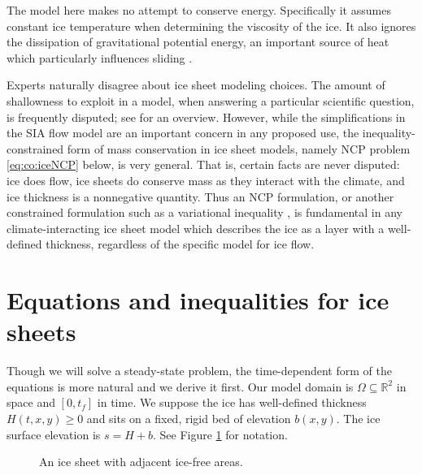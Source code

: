 \documentclass[final,leqno,onefignum,onetabnum]{siamltex1213bueler}
\newcommand\RR{\mathbb{R}}
\begin{document}
The model here makes no attempt to conserve energy.  Specifically it assumes constant ice temperature when determining the viscosity of the ice.  It also ignores the dissipation of gravitational potential energy, an important source of heat which particularly influences sliding \cite{Fowler1997,GreveBlatter2009,vanderVeen2013}.

Experts naturally disagree about ice sheet modeling choices.  The amount of shallowness to exploit in a model, when answering a particular scientific question, is frequently disputed; see \cite{SchoofHewitt2013} for an overview.  However, while the simplifications in the SIA flow model are an important concern in any proposed use, the inequality-constrained form of mass conservation in ice sheet models, namely NCP problem \eqref{eq:co:iceNCP} below, is very general.  That is, certain facts are never disputed: ice does flow, ice sheets do conserve mass as they interact with the climate, and ice thickness is a nonnegative quantity.  Thus an NCP formulation, or another constrained formulation such as a variational inequality \cite{JouvetBueler2012}, is fundamental in any climate-interacting ice sheet model which describes the ice as a layer with a well-defined thickness, regardless of the specific model for ice flow.


\section{Equations and inequalities for ice sheets}

Though we will solve a steady-state problem, the time-dependent form of the equations is more natural and we derive it first.  Our model domain is $\Omega \subseteq \RR^2$ in space and $[0,t_f]$ in time.  We suppose the ice has well-defined thickness $H(t,x,y) \ge 0$ and sits on a fixed, rigid bed of elevation $b(x,y)$.  The ice surface elevation is $s = H+b$.  See Figure \ref{fig:co:iceschematic} for notation.

\medskip
\begin{figure}[h]
\begin{center}

\end{center}
\caption{An ice sheet with adjacent ice-free areas.}
\label{fig:co:iceschematic}
\end{figure}
\end{document}
